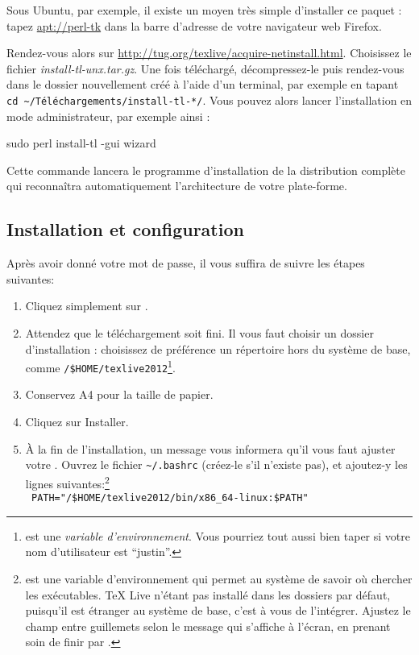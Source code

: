 Sous Ubuntu, par exemple, il existe un moyen très simple d'installer ce paquet : tapez \url{apt://perl-tk} dans la barre d'adresse de votre navigateur web Firefox.

Rendez-vous alors sur \url{http://tug.org/texlive/acquire-netinstall.html}. Choisissez  le fichier \emph{install-tl-unx.tar.gz}. Une fois téléchargé, décompressez-le puis rendez-vous dans le dossier nouvellement créé à l'aide d'un terminal, par exemple en tapant \verb|cd ~/Téléchargements/install-tl-*/|. Vous pouvez alors lancer l'installation en mode administrateur, par exemple ainsi :

\begin{bashcode}
sudo perl install-tl -gui wizard
\end{bashcode}
Cette commande lancera le programme d'installation de la distribution complète qui reconnaîtra automatiquement l'architecture de votre plate-forme.

\subsection{Installation et configuration}

Après avoir donné votre mot de passe, il vous suffira de suivre les étapes suivantes:

\begin{enumerate}
\item Cliquez simplement sur .
\item Attendez que le téléchargement soit fini. Il vous faut choisir un dossier d'installation : choisissez de préférence un répertoire hors du système de base, comme \verb|/$HOME/texlive2012|\footnote{ est une \emph{variable d'environnement}. Vous pourriez tout aussi bien taper  si votre nom d'utilisateur est \enquote{justin}.}.
\item Conservez A4 pour la taille de papier.
\item Cliquez sur Installer.
\item À la fin de l'installation, un message vous informera qu'il vous faut ajuster votre . Ouvrez le fichier \verb|~/.bashrc| (créez-le s'il n'existe pas), et ajoutez-y les lignes suivantes:\footnote{ est une variable d'environnement qui permet au système de savoir où chercher les exécutables. TeX Live n'étant pas installé dans les dossiers par défaut, puisqu'il est étranger au système de base, c'est à vous de l'intégrer. Ajustez le champ entre guillemets selon le message qui s'affiche à l'écran, en prenant soin de finir par  .}\\
\verb| PATH="/$HOME/texlive2012/bin/x86_64-linux:$PATH"|
\end{enumerate}

